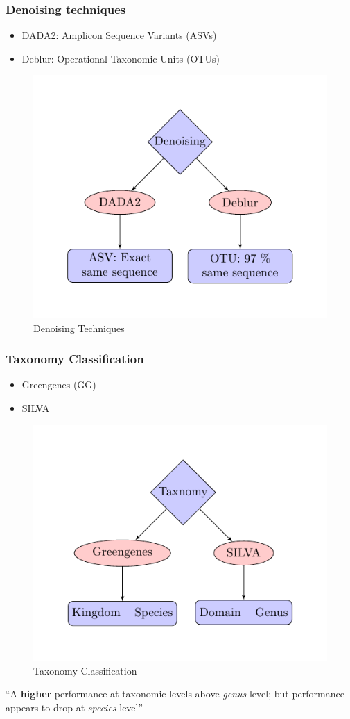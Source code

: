 \documentclass{beamer}
\begin{document}
    \begin{frame}
        \frametitle{Denoising techniques}

        \begin{itemize}
            \item DADA2: Amplicon Sequence Variants (ASVs) \cite{DADA1}
            \item Deblur: Operational Taxonomic Units (OTUs) \cite{deblur1}
        \end{itemize}

        \begin{figure}
            \centering
            \includegraphics[width=0.4 \linewidth]{figures/denoising/denoising.pdf}
            \caption{Denoising Techniques}
            \label{fig:denoising}
        \end{figure}
    \end{frame}

    \begin{frame}
        \frametitle{Taxonomy Classification}

        \begin{itemize}
            \item Greengenes (GG) \cite{greengenes1}
            \item SILVA \cite{silva1}
        \end{itemize}

        \begin{figure}
            \centering
            \includegraphics[width=0.4 \linewidth]{figures/taxonomy/taxonomy.pdf}
            \caption{Taxonomy Classification}
            \label{fig:taxonomy}
        \end{figure}

        “A \textbf{higher} performance at taxonomic levels above \textit{genus} level; but performance appears to drop at \textit{species} level” \cite{performance1}
    \end{frame}
\end{document}
